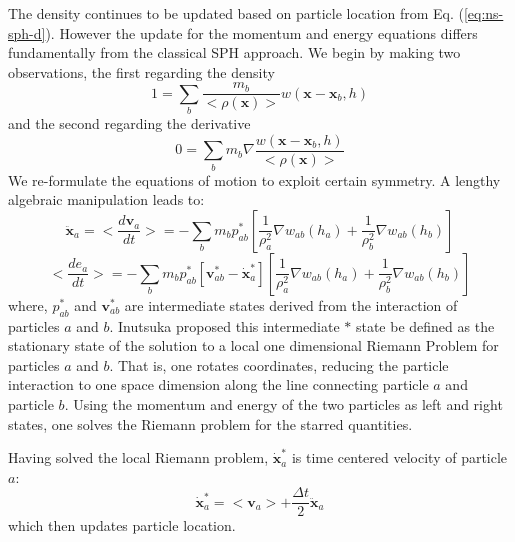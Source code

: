 \documentclass[preprint,12pt,authoryear]{elsarticle}
\begin{document}
The density continues to be updated based on particle location from Eq. (\ref{eq:ns-sph-d}). However the update for the momentum and energy equations differs fundamentally from the classical SPH approach. We begin by making two observations, the first regarding the density
\begin{equation}
1=\sum_{b} \frac{m_{b}}{<\rho(\textbf{x})>}w(\textbf{x} - \textbf{x}_{b}, h)
\label{eq:GSPH-basic1}
\end{equation}
and the second regarding the derivative 
\begin{equation}
0=\sum_{b} m_{b} \nabla \frac{w(\textbf{x} - \textbf{x}_{b}, h)}{<\rho(\textbf{x})>}
\label{eq:GSPH-basic2}
\end{equation}
We re-formulate the equations of motion to exploit certain symmetry. A lengthy algebraic manipulation \citep{inutsuka2002reformulation,iwasaki2011smoothed} leads to:
\begin{equation}
\ddot{\textbf{x}}_{a} = <\dfrac{d \textbf{v}_{a}}{dt}>= -\sum_{b} m_{b} p_{a b}^{\ast} \left[\frac{1}{\rho_{a}^2} \nabla w_{a b}(h_{a}) + \frac{1}{\rho_{b}^2} \nabla w_{a b}(h_{b}) \right]
\label{eq:gov-gsph-v-simple-form}
\end{equation}
\begin{equation}
<\dfrac{d e_{a}}{dt}>= - \sum_{b} m_{b} p_{a b}^{\ast} [\textbf{v}_{a b}^{\ast} - \dot{\textbf{x}}_{a}^{\ast}] \left[\frac{1}{\rho_{a}^2} \nabla w_{a b}(h_{a}) + \frac{1}{\rho_{b}^2} \nabla w_{a b}(h_{b}) \right]
\label{eq:gov-gsph-e-simple-form}
\end{equation}
where, $p_{a b}^{\ast}$ and $\textbf{v}_{a b}^{\ast}$ are intermediate states derived from the interaction of particles $a$ and $b$. Inutsuka proposed this intermediate $\ast$ state be defined as the stationary state of the solution to a local one dimensional Riemann Problem for particles $a$ and $b$.  That is, one rotates coordinates, reducing the particle interaction to one space dimension along the line connecting particle $a$ and particle $b$. Using the momentum and energy of the two particles as left and right states, one solves the Riemann problem for the starred quantities.

Having solved the local Riemann problem, 
$\dot{\textbf{x}}_{a}^{\ast}$ is time centered velocity of particle $a$:
\begin{equation}
\dot{\textbf{x}}_{a}^{\ast} = <\textbf{v}_{a}> + \frac{\Delta t}{2} \ddot{\textbf{x}}_{a}
\end{equation}
which then updates particle location.
\end{document}
